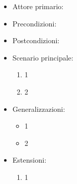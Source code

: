 \begin{itemize}
    \item Attore primario:
    \item Precondizioni:
    \item Postcondizioni:
    \item Scenario principale: \begin{enumerate}
        \item 1
        \item 2
    \end{enumerate}
    \item Generalizzazioni: \begin{itemize}
        \item 1
        \item 2
    \end{itemize}
    \item Estensioni: \begin{enumerate}
        \item 1
    \end{enumerate}
\end{itemize}



